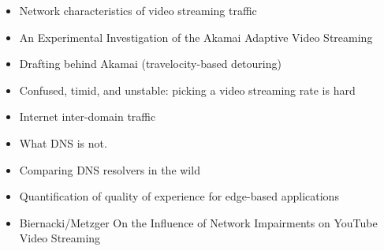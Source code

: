\begin{itemize}
	\item Network characteristics of video streaming traffic \cite{Rao:2011:NCV:2079296.2079321}
	\item An Experimental Investigation of the Akamai Adaptive Video Streaming \cite{cicco2010akamai}
	\item Drafting behind Akamai (travelocity-based detouring) \cite{Su:2006:DBA:1159913.1159962}
	\item Confused, timid, and unstable: picking a video streaming rate is hard \cite{Huang:2012:CTU:2398776.2398800}
	\item Internet inter-domain traffic \cite{Labovitz:2010:IIT:2043164.1851194}
	\item What DNS is not. \cite{vixie2009dns}
	\item Comparing DNS resolvers in the wild \cite{ager2010comparing}
	\item Quantification of quality of experience for edge-based applications\cite{hossfeld2007quantification}
	\item Biernacki/Metzger On the Influence of Network Impairments on YouTube Video Streaming \cite{cs3518}
\end{itemize}


